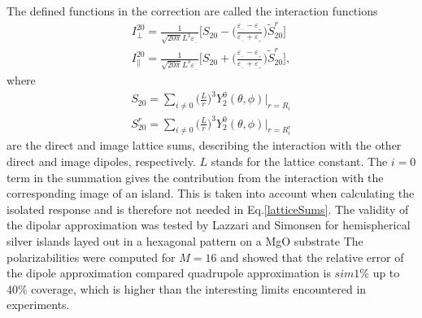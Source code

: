 %
The defined functions in the correction are called the interaction functions \cite{Lazzari2002}
%
\begin{subequations}
\label{couplingPolarizability}
\begin{align}
I_{\perp}^{20} = \frac{1}{\sqrt{20\pi} L^3 \varepsilon_{_-} } 
   \Bigg[
   S_{20} - \Bigg( \frac{\varepsilon_{_-}-\varepsilon_{_+}}{\varepsilon_{_-}+\varepsilon_{_+}} \Bigg) 
   \tilde{S}_{20}^r
   \Bigg]
   \label{couplingPolarizability1}\\
%
   I_{\parallel}^{20} = \frac{1}{\sqrt{20\pi} L^3 \varepsilon_{_-} } 
   \Bigg[
   S_{20} + \Bigg( \frac{\varepsilon_{_-}-\varepsilon_{_+}}{\varepsilon_{_-}+\varepsilon_{_+}} \Bigg) 
   \tilde{S}_{20}^r
   \Bigg],
   \label{couplingPolarizability2}
\end{align}
\end{subequations}
%
where
%
\begin{subequations}
\label{latticeSums}
\begin{align}
   S_{20} = \sum\limits_{i \neq 0} \Bigg( \frac{L}{r}\Bigg)^3 Y_2^0 (\theta,\phi) \Biggr|_{r=R_i}
   \label{latticeSums1} \\
%
   S_{20}^r = \sum\limits_{i \neq 0} \Bigg( \frac{L}{r}\Bigg)^3 Y_2^0 (\theta,\phi) \Biggr|_{r=R_i^r}
   \label{latticeSums2}
\end{align}
\end{subequations}
%
are the direct and image lattice sums, describing the interaction with the other direct and 
image dipoles, respectively. $L$ stands for the lattice constant. The $i=0$ term in the summation
gives the contribution from the interaction with the corresponding image of an island. This 
is taken into account when calculating the isolated response and is therefore not needed in
Eq.\eqref{latticeSums}. 
The validity of the dipolar approximation was tested by Lazzari and Simonsen
for hemispherical silver islands layed out in a hexagonal pattern on a MgO substrate
\cite[p.~129-130]{Lazzari2002} The polarizabilities were computed for $M = 16$ 
and showed that the relative error of the dipole approximation compared quadrupole approximation is
$sim 1\%$ up to 40\% coverage, which is higher than the interesting limits encountered in 
experiments.




















